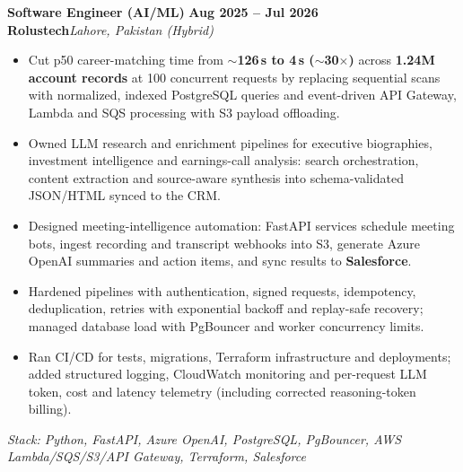 \documentclass[a4paper,10pt]{article}
\newcommand{\role}[4]{%
  {\large\bfseries #1}\hfill{\bfseries\color{accent} #2}\\
  {\color{accent2}\bfseries #3}\hfill{\color{muted}\itshape #4}\par
}
\newcommand{\stack}[1]{{\color{muted}\small\itshape Stack: #1}\par}
\begin{document}
\role{Software Engineer (AI/ML)}{Aug 2025 -- Jul 2026}{Rolustech}{Lahore, Pakistan (Hybrid)}
\begin{itemize}
  \item Cut p50 career-matching time from \textbf{$\sim$126\,s to 4\,s ($\sim$30$\times$)} across \textbf{1.24M account records} at 100 concurrent requests by replacing sequential scans with normalized, indexed PostgreSQL queries and event-driven API Gateway, Lambda and SQS processing with S3 payload offloading.
  \item Owned LLM research and enrichment pipelines for executive biographies, investment intelligence and earnings-call analysis: search orchestration, content extraction and source-aware synthesis into schema-validated JSON/HTML synced to the CRM.
  \item Designed meeting-intelligence automation: FastAPI services schedule meeting bots, ingest recording and transcript webhooks into S3, generate Azure OpenAI summaries and action items, and sync results to \textbf{Salesforce}.
  \item Hardened pipelines with authentication, signed requests, idempotency, deduplication, retries with exponential backoff and replay-safe recovery; managed database load with PgBouncer and worker concurrency limits.
  \item Ran CI/CD for tests, migrations, Terraform infrastructure and deployments; added structured logging, CloudWatch monitoring and per-request LLM token, cost and latency telemetry (including corrected reasoning-token billing).
\end{itemize}
\stack{Python, FastAPI, Azure OpenAI, PostgreSQL, PgBouncer, AWS Lambda/SQS/S3/API Gateway, Terraform, Salesforce}
\vspace{4pt}
\end{document}
